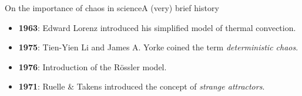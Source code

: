 \documentclass[usenames,dvipsnames,svgnames,10pt,aspectratio=169]{beamer}
\begin{document}
\begin{frame}[t, c]{On the importance of chaos in science}{A (very) brief history}
	\begin{itemize}
		\item \alert{\textbf{1963}}: Edward Lorenz introduced his simplified model of thermal convection.

		\bigskip

		\item \alert{\textbf{1975}}: Tien-Yien Li and James A. Yorke coined the term \emph{deterministic chaos}.

		\bigskip

		\item \alert{\textbf{1976}}: Introduction of the R\"ossler model.

		\bigskip

		\item \alert{\textbf{1971}}: Ruelle \& Takens introduced the concept of \emph{strange attractors}.
	\end{itemize}

	\vspace{1cm}
\end{frame}
\end{document}
